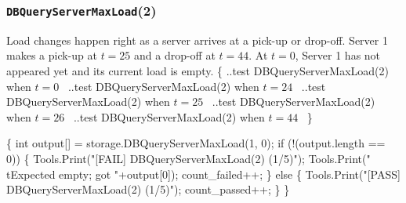 \documentclass{article}
\def\nwendcode{\endtrivlist \endgroup}
\let\nwdocspar=\par
\begin{document}
\subsubsection{{\tt{}DBQueryServerMaxLoad}(2)}
Load changes happen right as a server arrives at a pick-up or drop-off.
Server 1 makes a pick-up at $t=25$ and a drop-off at $t=44$. At $t=0$, Server 1
has not appeared yet and its current load is empty.
\nwenddocs{}\endmoddef{}
\{
  \LA{}..test \code{}DBQueryServerMaxLoad\edoc{}(2) when $t=0$~{\nwtagstyle{}}\RA{}
  \LA{}..test \code{}DBQueryServerMaxLoad\edoc{}(2) when $t=24$~{\nwtagstyle{}}\RA{}
  \LA{}..test \code{}DBQueryServerMaxLoad\edoc{}(2) when $t=25$~{\nwtagstyle{}}\RA{}
  \LA{}..test \code{}DBQueryServerMaxLoad\edoc{}(2) when $t=26$~{\nwtagstyle{}}\RA{}
  \LA{}..test \code{}DBQueryServerMaxLoad\edoc{}(2) when $t=44$~{\nwtagstyle{}}\RA{}
\}
\nwendcode{}\nwdocspar
\nwenddocs{}\endmoddef{}
\{
  int output[] = storage.DBQueryServerMaxLoad(1, 0);
  if (!(output.length == 0)) \{
    Tools.Print("[FAIL] DBQueryServerMaxLoad(2) (1/5)");
    Tools.Print("\\tExpected empty; got "+output[0]);
    count_failed++;
  \} else \{
    Tools.Print("[PASS] DBQueryServerMaxLoad(2) (1/5)");
    count_passed++;
  \}
\}
\nwendcode{}\nwdocspar
\nwenddocs{}\endmoddef{}
\end{document}
